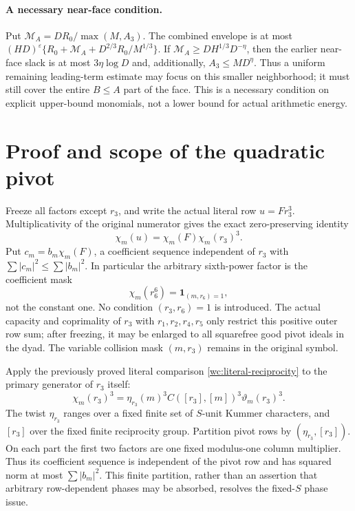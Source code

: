 \documentclass[11pt,oneside,openany]{book}
\theoremstyle{definition}\newtheorem{definition}[theorem]{Definition}
\theoremstyle{remark}\newtheorem{remark}[theorem]{Remark}
\begin{document}
\paragraph{A necessary near-face condition.}\label{qp:near}
Put $\mathcal M_A=DR_0/\max(M,A_3)$.
The combined envelope is at most
$(HD)^\varepsilon\{R_0+\mathcal M_A+D^{2/3}R_0/M^{1/3}\}$.
If $\mathcal M_A\ge DH^{1/3}D^{-\eta}$, then the earlier
near-face slack is at most $3\eta\log D$ and, additionally,
$A_3\le M D^\eta$. Thus a uniform remaining leading-term estimate
may focus on this smaller neighborhood; it must still cover the entire
$B\le A$ part of the face. This is a necessary condition on explicit
upper-bound monomials, not a lower bound for actual arithmetic energy.

\section{Proof and scope of the quadratic pivot}\label{qp:details}
Freeze all factors except $r_3$, and write the actual literal row
$u=Fr_3^3$. Multiplicativity of the original numerator gives the exact
zero-preserving identity
\[
 \chi_m(u)=\chi_m(F)\chi_m(r_3)^3.
\]
Put $c_m=b_m\chi_m(F)$, a coefficient sequence independent of $r_3$ with
$\sum|c_m|^2\le\sum|b_m|^2$. In particular the arbitrary sixth-power
factor is the coefficient mask
\[
 \chi_m(r_6^6)=\mathbf1_{(m,r_6)=1},
\]
not the constant one. No condition $(r_3,r_6)=1$ is introduced.
The actual capacity and coprimality of $r_3$ with
$r_1,r_2,r_4,r_5$ only restrict this positive outer row sum; after freezing,
it may be enlarged to all squarefree good pivot ideals in the dyad.
The variable collision mask $(m,r_3)$ remains in the original symbol.

Apply the previously proved literal comparison
\eqref{wc:literal-reciprocity} to the primary generator of $r_3$ itself:
\[
 \chi_m(r_3)^3=
 \eta_{r_3}(m)^3 C([r_3],[m])^3\vartheta_m(r_3)^3.
\]
The twist $\eta_{r_3}$ ranges over a fixed finite set of $S$-unit Kummer
characters, and $[r_3]$ over the fixed finite reciprocity group.
Partition pivot rows by $(\eta_{r_3},[r_3])$. On each part the first two
factors are one fixed modulus-one column multiplier. Thus its coefficient
sequence is independent of the pivot row and has squared norm at most
$\sum|b_m|^2$. This finite partition, rather than an assertion that arbitrary
row-dependent phases may be absorbed, resolves the fixed-$S$ phase issue.
\end{document}
